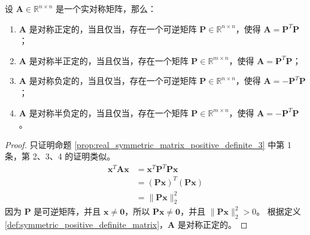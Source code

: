 \begin{proposition}[实对称矩阵的正定性的判定法 3]
    设 $\mathbf{A}\in \mathbb{R}^{n\times n}$ 是一个实对称矩阵，那么：
    \begin{enumerate}
        \item $\mathbf{A}$ 是对称正定的，当且仅当，存在一个可逆矩阵 $\mathbf{P} \in \mathbb{R}^{n \times n}$，使得 $\mathbf{A} = \mathbf{P}^T \mathbf{P}$；
        \item $\mathbf{A}$ 是对称半正定的，当且仅当，存在一个矩阵 $\mathbf{P} \in \mathbb{R}^{m \times n}$，使得 $\mathbf{A} = \mathbf{P}^T \mathbf{P}$；
        \item $\mathbf{A}$ 是对称负定的，当且仅当，存在一个可逆矩阵 $\mathbf{P} \in \mathbb{R}^{n \times n}$，使得 $\mathbf{A} = -\mathbf{P}^T \mathbf{P}$；
        \item $\mathbf{A}$ 是对称半负定的，当且仅当，存在一个矩阵 $\mathbf{P} \in \mathbb{R}^{m \times n}$，使得 $\mathbf{A} = -\mathbf{P}^T \mathbf{P}$。
    \end{enumerate}
    \label{prop:real_symmetric_matrix_positive_definite_3}
\end{proposition}

\begin{proof}
    只证明命题 \ref{prop:real_symmetric_matrix_positive_definite_3} 中第 1 条，第 2、3、4 的证明类似。
    \begin{align*}
        \mathbf{x}^T\mathbf{A}\mathbf{x} & = \mathbf{x}^T \mathbf{P}^T \mathbf{P} \mathbf{x} \\
        & = (\mathbf{P}\mathbf{x})^T (\mathbf{P}\mathbf{x}) \\
        & = \|\mathbf{P}\mathbf{x}\|_2^2
    \end{align*}
    因为 $\mathbf{P}$ 是可逆矩阵，并且 $\mathbf{x}\neq \mathbf{0}$，所以 $\mathbf{P}\mathbf{x} \neq \mathbf{0}$，并且 $\|\mathbf{P}\mathbf{x}\|_2^2 > 0$。
    根据定义 \ref{def:symmetric_positive_definite_matrix}，$\mathbf{A}$ 是对称正定的。
\end{proof}

